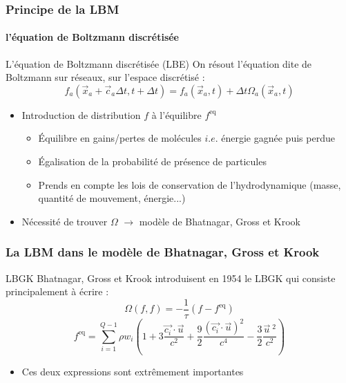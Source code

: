 \documentclass[12pt, xcolor=svgnames]{beamer}
\newcommand{\feq}{$f^{\text{eq}}$}
\newcommand{\BeGK}{Bhatnagar, Gross et Krook}
\newcommand{\qttmvt}{quantité de mouvement}
\newcommand{\bwarrow}{\item[\color{DarkRed} \ding{227}]}
\newcommand{\warrow}{\item[\color{blue!50!black!70} \tiny{\ding{109}}]}
\newcommand{\bepar}[1]{
	\left( #1 \right)  
}
\begin{document}
\begin{frame}
\frametitle{Principe de la LBM}
\framesubtitle{l'équation de Boltzmann discrétisée}
\begin{block}{L'équation de Boltzmann discrétisée (LBE)}
On résout l'équation dite de Boltzmann sur réseaux, sur l'espace discrétisé :
\begin{equation*}
f_a\bepar{\vec{x}_a + \vec{c}_a \Delta t, t + \Delta t} = f_a\bepar{\vec{x}_a, t} + \Delta t \Omega_a\bepar{\vec{x}_a,t}
\end{equation*}
\end{block}

\begin{itemize}
	\bwarrow Introduction de distribution $f$ à l'équilibre \feq
	\begin{itemize}
		\warrow Équilibre en gains/pertes de molécules $i.e.$ énergie gagnée puis perdue
		\warrow Égalisation de la probabilité de présence de particules
		\warrow Prends en compte les lois de conservation de l'hydrodynamique (masse, \qttmvt$ $, énergie...)
	\end{itemize}
	\bwarrow Nécessité de trouver $\Omega$ $\rightarrow$ modèle de \BeGK
\end{itemize}


\end{frame}

\begin{frame}
\frametitle{La LBM dans le modèle de \BeGK}
\begin{block}{LBGK}
	 \BeGK $ $ introduisent en 1954 le LBGK qui consiste principalement à écrire : \\
	\begin{equation*}
	\Omega(f, f)= -\dfrac{1}{\tau} \bepar{f-f^{\text{eq}}}
	\end{equation*}
	\begin{equation*}
	 f^{\text{eq}} = \sum_{i=1}^{Q-1}\rho w_i \left(1 + 3 \frac{\vec{c_i}\cdot \vec{u}}{c^2} +  \frac{9}{2}\frac{\left( \vec{c_i} \cdot \vec{u} \right )^ 2}{c^4} - \frac{3}{2}\frac{\vec{u}\ ^2}{c^2}\right)
	\end{equation*}

\end{block}
\begin{itemize}
\bwarrow Ces deux expressions sont extrêmement importantes 
\end{itemize}

\end{frame}
\end{document}
